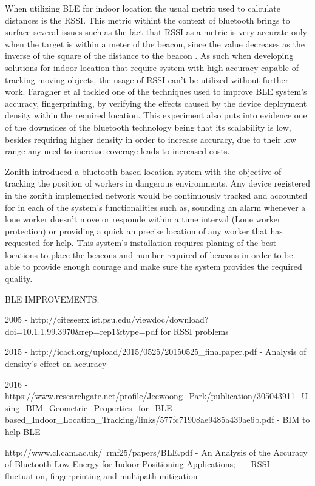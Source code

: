 When utilizing BLE for indoor location the usual metric used to calculate distances is the RSSI. This metric withint the context of bluetooth brings to surface several issues such as the fact that RSSI as a metric is very accurate only when the target is within a meter of the beacon, since the value decreases as the inverse of the square of the distance to the beacon . As such when developing solutions for indoor location that require system with high accuracy capable of tracking moving objects, the usage of RSSI can't be utilized without further work. Faragher et al \cite{bleacc} tackled one of the techniques used to improve BLE system's accuracy, fingerprinting, by verifying the effects caused by the device deployment density within the required location. This experiment also puts into evidence one of the downsides of the bluetooth technology being that its scalability is low, besides requiring higher density in order to increase accuracy, due to their low range any need to increase coverage leads to increased costs.


Zonith \cite{zonith} introduced a bluetooth based location system with the objective of tracking the position of workers in dangerous environments. Any device registered in the zonith implemented network would be continuously tracked and accounted for in each of the system's functionalities such as, sounding an alarm whenever a lone worker doesn't move or responde within a time interval (Lone worker protection) or providing a quick an precise location of any worker that has requested for help. This system's installation requires planing of the best locations to place the beacons and number required of beacons in order to be able to provide enough courage and make sure the system provides the required quality.




BLE IMPROVEMENTS.

2005 - http://citeseerx.ist.psu.edu/viewdoc/download?doi=10.1.1.99.3970&rep=rep1&type=pdf for RSSI problems

2015 - http://icact.org/upload/2015/0525/20150525_finalpaper.pdf - Analysis of density's effect on accuracy

2016 - https://www.researchgate.net/profile/Jeewoong_Park/publication/305043911_Using_BIM_Geometric_Properties_for_BLE-based_Indoor_Location_Tracking/links/577fc71908ae9485a439ae6b.pdf -  BIM to help BLE

http://www.cl.cam.ac.uk/~rmf25/papers/BLE.pdf -  An Analysis of the Accuracy of Bluetooth Low Energy for Indoor Positioning Applications;
-----RSSI fluctuation, fingerprinting and multipath mitigation

